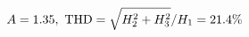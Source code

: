 \documentclass[preview]{standalone}
\begin{document}
\begin{align*}
\special{dvisvgm:raw <g id='unique000'>}A=1.35,\ \text{THD}=\sqrt{H_2^2+H_3^2}/H_1=21.4\%\special{dvisvgm:raw </g>}
\end{align*}
\end{document}
